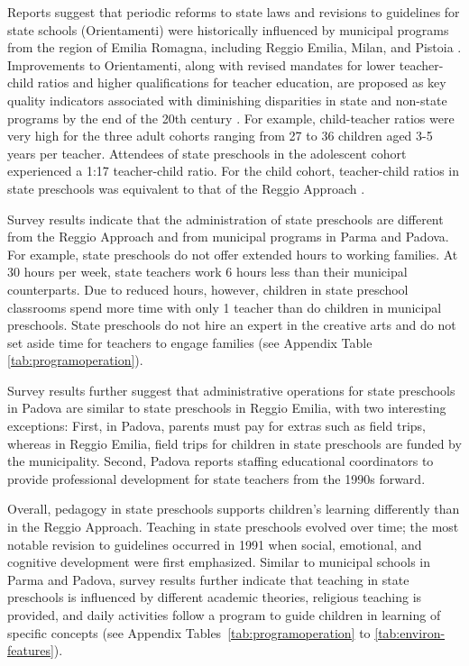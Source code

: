 Reports suggest that periodic reforms to state laws and revisions to guidelines for state schools (Orientamenti) were historically influenced by municipal programs from the region of Emilia Romagna, including Reggio Emilia, Milan, and Pistoia \citep{OECD_2001_Italy-Country-Note}. Improvements to Orientamenti, along with revised mandates for lower teacher-child ratios and higher qualifications for teacher education, are proposed as key quality indicators associated with diminishing disparities in state and non-state programs by the end of the 20th century \citep{Hohnerlein_2015_Development-and-Diffusion}. For example, child-teacher ratios were very high for the three adult cohorts ranging from 27 to 36 children aged 3-5 years per teacher. Attendees of state preschools in the adolescent cohort experienced a 1:17 teacher-child ratio. For the child cohort, teacher-child ratios in state preschools was equivalent to that of the Reggio Approach \citep{Hohnerlein_2015_Development-and-Diffusion}.

Survey results indicate that the administration of state preschools are different from the Reggio Approach and from municipal programs in Parma and Padova. For example, state preschools do not offer extended hours to working families. At 30 hours per week, state teachers work 6 hours less than their municipal counterparts. Due to reduced hours, however, children in state preschool classrooms spend more time with only 1 teacher than do children in municipal preschools. State preschools do not hire an expert in the creative arts and do not set aside time for teachers to engage families (see Appendix Table \ref{tab:programoperation}). 

Survey results further suggest that administrative operations for state preschools in Padova are similar to state preschools in Reggio Emilia, with two interesting exceptions: First, in Padova, parents must pay for extras such as field trips, whereas in Reggio Emilia, field trips for children in state preschools are funded by the municipality. Second, Padova reports staffing educational coordinators to provide professional development for state teachers from the 1990s forward. 

Overall, pedagogy in state preschools supports children's learning differently than in the Reggio Approach. Teaching in state preschools evolved over time; the most notable revision to guidelines occurred in 1991 when social, emotional, and cognitive development were first emphasized. Similar to municipal schools in Parma and Padova, survey results further indicate that teaching in state preschools is influenced by different academic theories, religious teaching is provided, and daily activities follow a program to guide children in learning of specific concepts (see Appendix Tables~\ref{tab:programoperation} to \ref{tab:environ-features}).  

